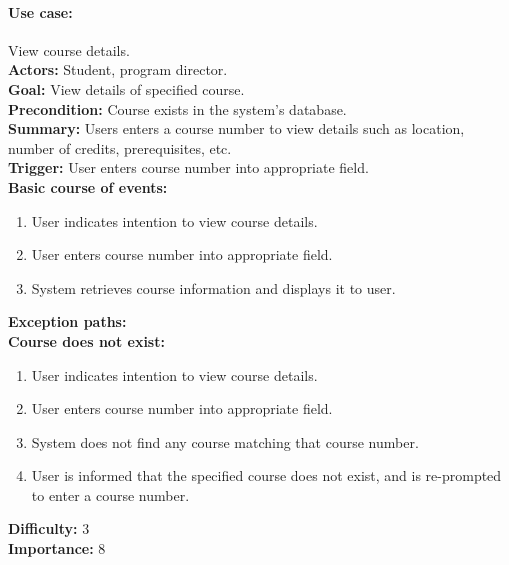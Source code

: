 \documentclass[12pt]{article}
\begin{document}
\paragraph*{Use case:} View course details.\\
\textbf{Actors:} Student, program director.\\
\textbf{Goal:} View details of specified course.\\
\textbf{Precondition:} Course exists in the system's database.\\
\textbf{Summary:} Users enters a course number to view details such as location, number of credits, prerequisites, etc.\\
\textbf{Trigger:} User enters course number into appropriate field.\\
\textbf{Basic course of events:}
\begin{enumerate}
\item User indicates intention to view course details.
\item User enters course number into appropriate field.
\item System retrieves course information and displays it to user.
\end{enumerate}
\textbf{Exception paths:}\\
\textbf{Course does not exist:}
\begin{enumerate}
\item User indicates intention to view course details.
\item User enters course number into appropriate field.
\item System does not find any course matching that course number.
\item User is informed that the specified course does not exist, and is re-prompted
to enter a course number.
\end{enumerate}
\textbf{Difficulty:} 3\\
\textbf{Importance:} 8\\
\end{document}
